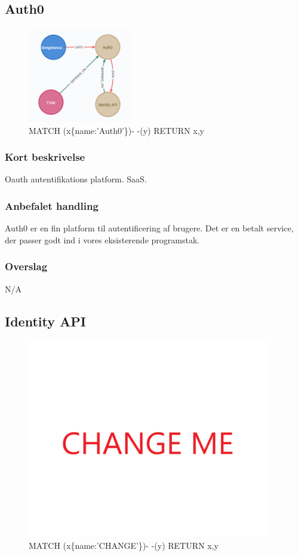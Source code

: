 \documentclass{article}
\begin{document}
\subsection{Auth0}
\begin{figure}[h]
\includegraphics[width=130pt]{Auth0.PNG}
\caption{MATCH (x\{name:'Auth0'\})- -(y) RETURN x,y}
\end{figure}
\subsubsection{Kort beskrivelse}
Oauth autentifikations platform. SaaS.
\subsubsection{Anbefalet handling}
Auth0 er en fin platform til autentificering af brugere. Det er en betalt service, der passer godt ind i vores eksisterende programstak. 
\subsubsection{Overslag}
N/A


\subsection{Identity API}
\begin{figure}[h]
\includegraphics[width=300pt]{CHANGE.PNG}
\caption{MATCH (x\{name:'CHANGE'\})- -(y) RETURN x,y}
\end{figure}
\end{document}
